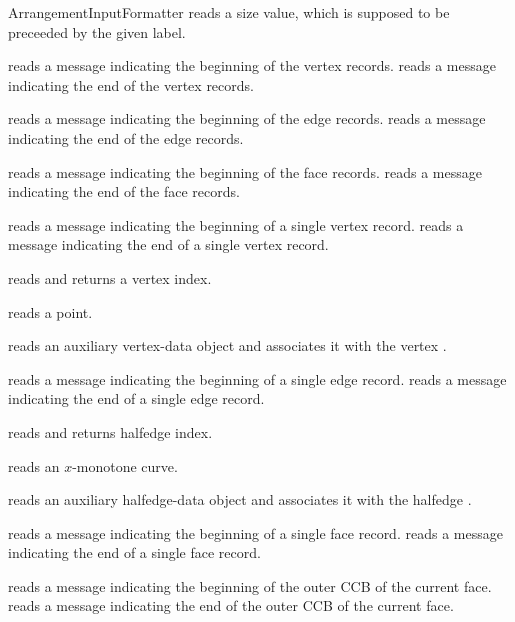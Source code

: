 \begin{ccRefConcept}{ArrangementInputFormatter}
    {reads a size value, which is supposed to be preceeded by the given label.}

    {reads a message indicating the beginning of the vertex records.}
\ccGlue
{}
    {reads a message indicating the end of the vertex records.}

    {reads a message indicating the beginning of the edge records.}
\ccGlue
{}
    {reads a message indicating the end of the edge records.}

    {reads a message indicating the beginning of the face records.}
\ccGlue
{}
    {reads a message indicating the end of the face records.}

    {reads a message indicating the beginning of a single vertex record.}
\ccGlue
{}
    {reads a message indicating the end of a single vertex record.}

    {reads and returns a vertex index.}

    {reads a point.}

    {reads an auxiliary vertex-data object and associates it with the vertex .}

    {reads a message indicating the beginning of a single edge record.}
\ccGlue
{}
    {reads a message indicating the end of a single edge record.}

    {reads and returns halfedge index.}

    {reads an $x$-monotone curve.}

    {reads an auxiliary halfedge-data object and associates it with the halfedge .}

    {reads a message indicating the beginning of a single face record.}
\ccGlue
{}
    {reads a message indicating the end of a single face record.}

    {reads a message indicating the beginning of the outer CCB of the current face.}
\ccGlue
{}
    {reads a message indicating the end of the outer CCB of the current face.}


\end{ccRefConcept}
